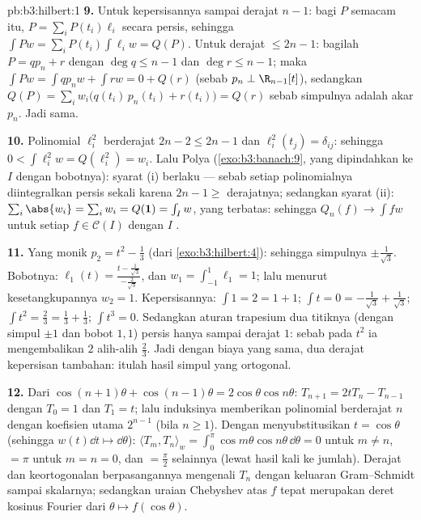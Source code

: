 \begin{solution}{pb:b3:hilbert:1}
\textbf{9.} Untuk kepersisannya sampai derajat $n - 1$: bagi $P$ semacam itu, $P =
\sum_iP(t_i)\ell_i$ secara persis, sehingga $\int Pw = \sum_iP(t_i)\int
\ell_iw = Q(P)$. Untuk derajat $\leq 2n - 1$: bagilah $P = qp_n + r$
dengan $\deg q \leq n - 1$ dan $\deg r \leq n-1$; maka $\int Pw = \int
qp_nw + \int rw = 0 + Q(r)$ (sebab $p_n \perp \R_{n-1}[t]$), sedangkan
$Q(P) = \sum_iw_i\bigl(q(t_i)\,p_n(t_i) + r(t_i)\bigr) = Q(r)$
sebab simpulnya adalah akar $p_n$. Jadi sama.

\textbf{10.} Polinomial $\ell_i^2$ berderajat $2n - 2 \leq 2n - 1$ dan
$\ell_i^2(t_j) = \delta_{ij}$: sehingga $0 < \int\ell_i^2w = Q(\ell_i^2)
= w_i$. Lalu Polya (\cref{exo:b3:banach:9}, yang dipindahkan ke $I$ dengan
bobotnya): syarat (i) berlaku --- sebab setiap polinomialnya diintegralkan
persis sekali karena $2n - 1 \geq$ derajatnya; sedangkan syarat (ii):
$\sum_i\abs{w_{i}} = \sum_iw_i = Q(\mathbf 1) = \int_Iw$,
yang terbatas: sehingga $Q_n(f) \to \int fw$ untuk setiap $f \in \mathcal C(I)$
dengan $I$ .

\textbf{11.} Yang monik $p_2 = t^2 - \frac13$ (dari
\cref{exo:b3:hilbert:4}): sehingga simpulnya $\pm\frac1{\sqrt3}$. Bobotnya:
$\ell_1(t) = \frac{t - \frac1{\sqrt3}}{-\frac2{\sqrt3}}$, dan
$w_1 = \int_{-1}^1\ell_1 = 1$; lalu menurut kesetangkupannya $w_2 = 1$.
Kepersisannya: $\int 1 = 2 = 1 + 1$; $\int t = 0 =
-\frac1{\sqrt3} + \frac1{\sqrt3}$; $\int t^2 = \frac23 =
\frac13 + \frac13$; $\int t^3 = 0$. Sedangkan aturan trapesium dua
titiknya (dengan simpul $\pm1$ dan bobot $1, 1$) persis hanya sampai derajat
$1$: sebab pada $t^2$ ia mengembalikan $2$ alih-alih $\frac23$. Jadi dengan biaya yang sama,
dua derajat kepersisan tambahan: itulah hasil simpul yang
ortogonal.

\textbf{12.} Dari $\cos(n{+}1)\theta + \cos(n{-}1)\theta =
2\cos\theta\cos n\theta$: $T_{n+1} = 2tT_n - T_{n-1}$ dengan
$T_0 = 1$ dan $T_1 = t$; lalu induksinya memberikan polinomial berderajat
$n$ dengan koefisien utama $2^{n-1}$ (bila $n \geq 1$).
Dengan menyubstitusikan $t = \cos\theta$ (sehingga $w(t)\dd t \mapsto
\dd\theta$): $\langle T_m, T_n\rangle_w =
\int_0^\pi\cos m\theta\cos n\theta\,\dd\theta = 0$ untuk $m
\neq n$, $= \pi$ untuk $m = n = 0$, dan $= \frac\pi2$ selainnya
(lewat hasil kali ke jumlah). Derajat dan keortogonalan berpasangannya
mengenali $T_n$ dengan keluaran Gram--Schmidt sampai
skalarnya; sedangkan uraian Chebyshev atas $f$ tepat merupakan
deret kosinus Fourier dari $\theta \mapsto f(\cos\theta)$.


\end{solution}
